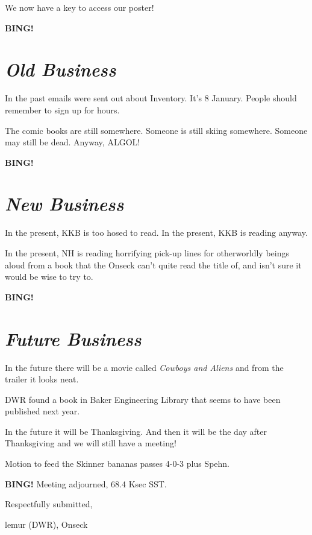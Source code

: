 \documentclass[10pt]{article}
\newcommand{\bing}{{\bf BING!} }
\newcommand{\goto}[1]{\bing \vskip 12pt \section*{{\em{#1}}}}
\newcommand{\ps}{ plus Spehn\xspace}
\newcommand{\onseck}{lemur (DWR), Onseck}
\begin{document}
We now have a key to access our poster!

\goto{Old Business}

In the past emails were sent out about Inventory.  It's 8 January.
People should remember to sign up for hours.

The comic books are still somewhere.  Someone is still skiing somewhere.
Someone may still be dead.  Anyway, ALGOL!

\goto{New Business}

In the present, KKB is too hosed to read.  In the present, KKB is reading
anyway.

In the present, NH is reading horrifying pick-up lines for otherworldly
beings aloud from a book that the Onseck can't quite read the title of,
and isn't sure it would be wise to try to.

\goto{Future Business}

In the future there will be a movie called \emph{Cowboys and Aliens}
and from the trailer it looks neat.

DWR found a book in Baker Engineering Library that seems to have been
published next year.

In the future it will be Thanksgiving.  And then it will be the day after
Thanksgiving and we will still have a meeting!

Motion to feed the Skinner bananas passes 4-0-3\ps.

\bing
\noindent
Meeting adjourned, 68.4 Ksec SST.

\vspace{18pt}

\centerline{Respectfully submitted,}
\centerline{\onseck}
\end{document}
